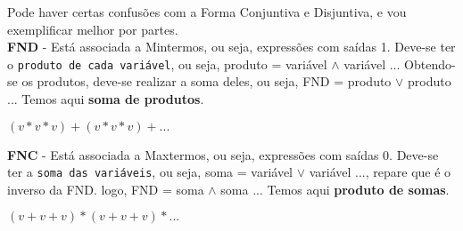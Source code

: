 \documentclass[12pt, onecolumn]{article}
\begin{document}
	Pode haver certas confusões com a Forma Conjuntiva e Disjuntiva, 
	e vou exemplificar melhor por partes. \\
	\newline
	\textbf{FND} - Está associada a Mintermos, ou seja, expressões com saídas 1.
	Deve-se ter o \texttt{produto de cada variável}, ou seja, 
	produto =  variável $\land$ variável ...
	Obtendo-se os produtos, deve-se realizar a soma deles, ou seja,
	FND =  produto $\lor$ produto ... Temos aqui \textbf{soma de produtos}. \\
	\begin{center}
		$(v * v * v) + (v * v * v) + ... $
	\end{center}
	\textbf{FNC} - Está associada a Maxtermos, ou seja, expressões com saídas 0.
	Deve-se ter a \texttt{soma das variáveis}, ou seja,
	soma = variável $\lor$ variável ..., repare que é o inverso da FND.
	logo, FND = soma $\land$ soma ... Temos aqui \textbf{produto de somas}. \\
	\begin{center}
		$(v + v + v) * (v + v + v) * ... $
	\end{center}


	
        
\end{document}
